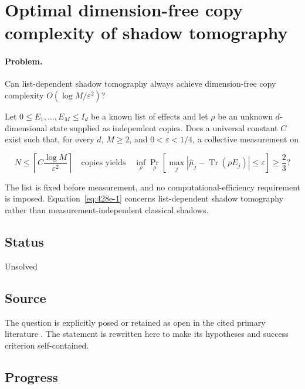 \section{Optimal dimension-free copy complexity of shadow tomography}
\label{sec:op_428e6c37ba03149a}

\paragraph{Problem.}
Can list-dependent shadow tomography always achieve dimension-free copy complexity $O(\log M/\varepsilon^2)$?

Let $0\leq E_1,\ldots,E_M\leq I_d$ be a known list of effects and let $\rho$ be an unknown $d$-dimensional state supplied as independent copies. Does a universal constant $C$ exist such that, for every $d$, $M\geq2$, and $0<\varepsilon<1/4$, a collective measurement on

\begin{equation}
N\leq\left\lceil C\frac{\log M}{\varepsilon^2}\right\rceil
\quad\text{copies yields}\quad
\inf_\rho\Pr_\rho\!\left[
\max_j|\widehat\mu_j-\operatorname{Tr}(\rho E_j)|\leq\varepsilon
\right]\geq\frac23?
\label{eq:428e-1}
\end{equation}

The list is fixed before measurement, and no computational-efficiency requirement is imposed. Equation~\eqref{eq:428e-1} concerns list-dependent shadow tomography rather than measurement-independent classical shadows.

\subsection*{Status}

Unsolved

\subsection*{Source}

The question is explicitly posed or retained as open in the cited primary literature .  The statement is rewritten here to make its hypotheses and success criterion self-contained.

\subsection*{Progress}

